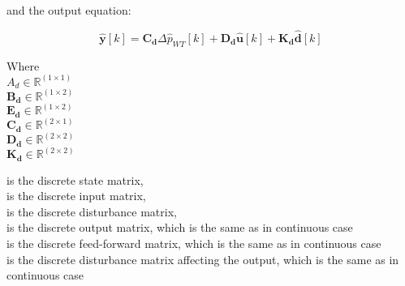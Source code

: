 and the output equation:

\begin{equation}
  \pmb{\hat{y}}[k] = \pmb{C_d} \Delta \hat{p}_{WT}[k] + \pmb{D_d} \pmb{\hat{u}}[k] + \pmb{K_d} \pmb{\hat{d}}[k]
\label{statespace_control_output_discrete}
\end{equation}

\begin{minipage}[t]{0.20\textwidth}
Where\\
\hspace*{8mm} $A_d \in \mathbb{R}^{(1 \times 1)}$ \\
\hspace*{8mm} $\pmb{B_d} \in \pmb{\mathbb{R}}^{(1 \times 2)}$ \\
\hspace*{8mm} $\pmb{E_d} \in \pmb{\mathbb{R}}^{(1 \times 2)}$ \\
\hspace*{8mm} $\pmb{C_d} \in \pmb{\mathbb{R}}^{(2 \times 1)}$ \\
\newline
\hspace*{8mm} $\pmb{D_d} \in \pmb{\mathbb{R}}^{(2 \times 2)}$ \\
\newline
\hspace*{8mm} $\pmb{K_d} \in \pmb{\mathbb{R}}^{(2 \times 2)}$ 
\end{minipage}
\begin{minipage}[t]{0.68\textwidth}
\vspace*{2mm}
is the discrete state matrix, \\
is the discrete input matrix, \\
is the discrete disturbance matrix, \\ 
is the discrete output matrix, which is the same as in continuous case \\
is the discrete feed-forward matrix, which is the same as in continuous case \\
is the discrete disturbance matrix affecting the output, which is the same as in continuous case \\
\end{minipage}

